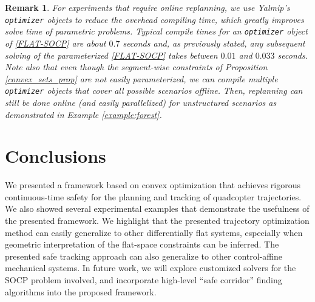 \documentclass[journal,10pt]{IEEEtran}
\newtheorem{remark}{\bfseries Remark}
\newif\ifdraft
\newcommand{\XX}[1]{\ifdraft{\color{red}[{\bf XX}: #1]}\fi}
\newcommand{\VF}[1]{\ifdraft{\color{blue}[{\bf VF}: #1]}\fi}
\begin{document}
\begin{remark} \label{online_replaning_remk}
For experiments that require online replanning, we use Yalmip's \texttt{optimizer} objects to reduce the overhead compiling time, which greatly improves solve time of parametric problems. Typical compile times for an \texttt{optimizer} object of \eqref{FLAT-SOCP} are about $0.7$ seconds and, as previously stated, any subsequent solving of the parameterized \eqref{FLAT-SOCP} takes between $0.01$ and $0.033$ seconds. Note also that even though the segment-wise constraints of Proposition \ref{convex_sets_prop} are not easily parameterized, we can compile multiple \texttt{optimizer} objects that cover all possible scenarios offline. Then, replanning can still be done online (and easily parallelized) for unstructured scenarios as demonstrated in Example \ref{example:forest}. 
\end{remark}


\section{Conclusions} \label{sec:Conclusions}
We presented a framework based on convex optimization that achieves rigorous continuous-time safety for the planning and tracking of quadcopter trajectories. We also showed several experimental examples that demonstrate the usefulness of the presented framework. We highlight that the presented trajectory optimization method can easily generalize to other differentially flat systems, especially when geometric interpretation of the flat-space constraints can be inferred. The presented safe tracking approach can also generalize to other control-affine mechanical systems. In future work, we will explore customized solvers for the SOCP problem involved, and incorporate high-level ``safe corridor'' finding algorithms into the proposed framework.
\end{document}
